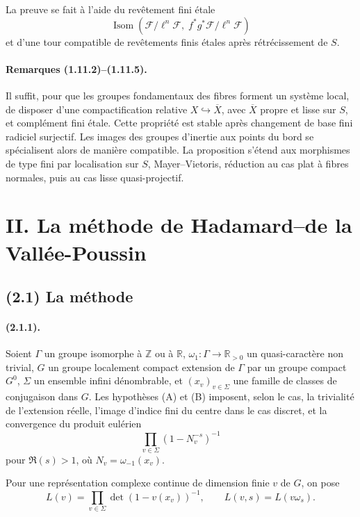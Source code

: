 \documentclass[11pt]{article}
\theoremstyle{remark}
\newcommand{\ZZ}{\mathbb{Z}}
\newcommand{\RR}{\mathbb{R}}
\begin{document}
La preuve se fait à l'aide du revêtement fini étale
\[
\operatorname{Isom}(\mathcal F/\ell^n\mathcal F,\; f^*g^*\mathcal F/\ell^n\mathcal F)
\]
et d'une tour compatible de revêtements finis étales après rétrécissement de \(S\).

\paragraph{Remarques (1.11.2)--(1.11.5).}
Il suffit, pour que les groupes fondamentaux des fibres forment un système local, de disposer d'une compactification relative \(X\hookrightarrow\overline X\), avec \(\overline X\) propre et lisse sur \(S\), et complément fini étale. Cette propriété est stable après changement de base fini radiciel surjectif. Les images des groupes d'inertie aux points du bord se spécialisent alors de manière compatible. La proposition s'étend aux morphismes de type fini par localisation sur \(S\), Mayer--Vietoris, réduction au cas plat à fibres normales, puis au cas lisse quasi-projectif.

\section*{II. La méthode de Hadamard--de la Vallée-Poussin}

\subsection*{(2.1) La méthode}

\paragraph{(2.1.1).}
Soient \(\Gamma\) un groupe isomorphe à \(\ZZ\) ou à \(\RR\), \(\omega_1:\Gamma\to\RR_{>0}\) un quasi-caractère non trivial, \(G\) un groupe localement compact extension de \(\Gamma\) par un groupe compact \(G^0\), \(\Sigma\) un ensemble infini dénombrable, et \((x_v)_{v\in\Sigma}\) une famille de classes de conjugaison dans \(G\). Les hypothèses (A) et (B) imposent, selon le cas, la trivialité de l'extension réelle, l'image d'indice fini du centre dans le cas discret, et la convergence du produit eulérien
\[
\prod_{v\in\Sigma}(1-N_v^{-s})^{-1}
\]
pour \(\Re(s)>1\), où \(N_v=\omega_{-1}(x_v)\).

Pour une représentation complexe continue de dimension finie \(v\) de \(G\), on pose
\[
L(v)=\prod_{v\in\Sigma}\det(1-v(x_v))^{-1},
\qquad
L(v,s)=L(v\omega_s).
\]
\end{document}
